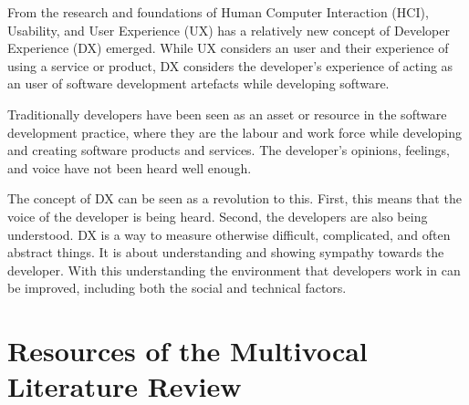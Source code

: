 \documentclass[english, 12pt, a4paper, sci, utf8, a-1b, online]{aaltothesis}
\begin{document}
From the research and foundations of Human Computer Interaction (HCI), Usability, and User Experience (UX) has a relatively new concept of Developer Experience (DX) emerged. While UX considers an user and their experience of using a service or product, DX considers the developer's experience of acting as an user of software development artefacts while developing software.

Traditionally developers have been seen as an asset or resource in the software development practice, where they are the labour and work force while developing and creating software products and services. The developer's opinions, feelings, and voice have not been heard well enough.

The concept of DX can be seen as a revolution to this. First, this means that the voice of the developer is being heard. Second, the developers are also being understood. DX is a way to measure otherwise difficult, complicated, and often abstract things. It is about understanding and showing sympathy towards the developer. With this understanding the environment that developers work in can be improved, including both the social and technical factors.

\clearpage
\thesisbibliography
\printbibliography

\clearpage
\thesisappendix

\section{Resources of the Multivocal Literature Review}

\renewcommand{\arraystretch}{1.5}
\end{document}
